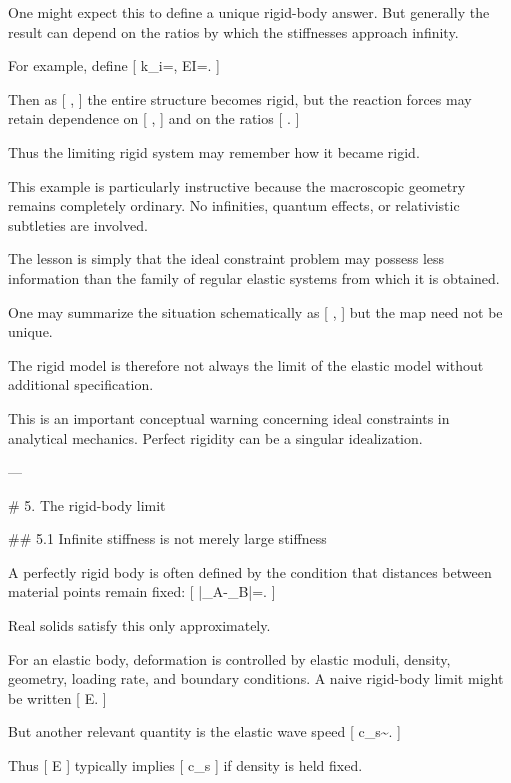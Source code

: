 One might expect this to define a unique rigid-body answer. But generally the result can depend on the ratios by which the stiffnesses approach infinity.

For example, define
[
k_i=,
\qquad
EI=.
]

Then as
[
\epsilon{},
]
the entire structure becomes rigid, but the reaction forces may retain dependence on
[
,
]
and on the ratios
[
.
]

Thus the limiting rigid system may remember how it became rigid.

This example is particularly instructive because the macroscopic geometry remains completely ordinary. No infinities, quantum effects, or relativistic subtleties are involved.

The lesson is simply that the ideal constraint problem may possess less information than the family of regular elastic systems from which it is obtained.

One may summarize the situation schematically as
[
\quad
\longrightarrow
\quad
{},
]
but the map need not be unique.

The rigid model is therefore not always the limit of the elastic model without additional specification.

This is an important conceptual warning concerning ideal constraints in analytical mechanics. Perfect rigidity can be a singular idealization.

---

# 5. The rigid-body limit

## 5.1 Infinite stiffness is not merely large stiffness

A perfectly rigid body is often defined by the condition that distances between material points remain fixed:
[
|_A-_B|=.
]

Real solids satisfy this only approximately.

For an elastic body, deformation is controlled by elastic moduli, density, geometry, loading rate, and boundary conditions. A naive rigid-body limit might be written
[
E\rightarrow\infty.
]

But another relevant quantity is the elastic wave speed
[
c_s\sim{}.
]

Thus
[
E\rightarrow\infty
]
typically implies
[
c_s\rightarrow\infty
]
if density is held fixed.

